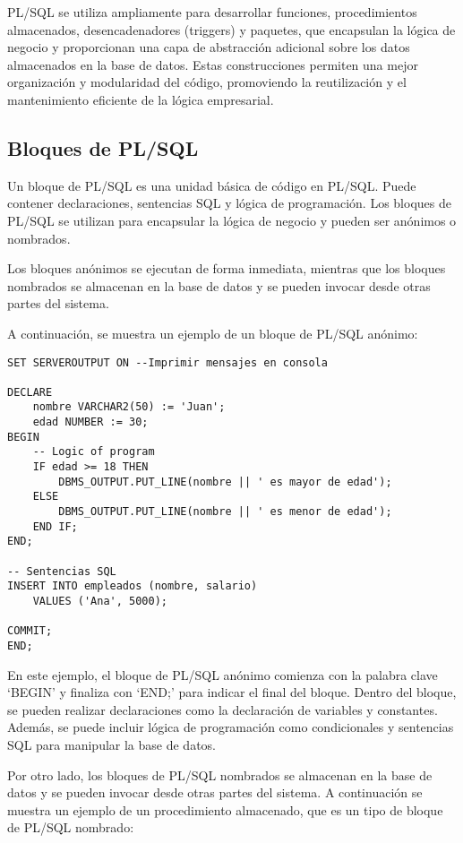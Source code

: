 \documentclass[executivepaper]{article}
\begin{document}
PL/SQL se utiliza ampliamente para desarrollar funciones, procedimientos almacenados, desencadenadores (triggers) y paquetes, que encapsulan la lógica de negocio y proporcionan una capa de abstracción adicional sobre los datos almacenados en la base de datos. Estas construcciones permiten una mejor organización y modularidad del código, promoviendo la reutilización y el mantenimiento eficiente de la lógica empresarial.

\subsection{Bloques de PL/SQL}
Un bloque de PL/SQL es una unidad básica de código en PL/SQL. Puede contener declaraciones, sentencias SQL y lógica de programación. Los bloques de PL/SQL se utilizan para encapsular la lógica de negocio y pueden ser anónimos o nombrados.

Los bloques anónimos se ejecutan de forma inmediata, mientras que los bloques nombrados se almacenan en la base de datos y se pueden invocar desde otras partes del sistema.

A continuación, se muestra un ejemplo de un bloque de PL/SQL anónimo:

\begin{lstlisting}
SET SERVEROUTPUT ON --Imprimir mensajes en consola

DECLARE
    nombre VARCHAR2(50) := 'Juan';
    edad NUMBER := 30;
BEGIN
    -- Logic of program
    IF edad >= 18 THEN
        DBMS_OUTPUT.PUT_LINE(nombre || ' es mayor de edad');
    ELSE
        DBMS_OUTPUT.PUT_LINE(nombre || ' es menor de edad');
    END IF;
END;

-- Sentencias SQL
INSERT INTO empleados (nombre, salario)
    VALUES ('Ana', 5000);

COMMIT;
END;
\end{lstlisting}

En este ejemplo, el bloque de PL/SQL anónimo comienza con la palabra clave \enquote*{BEGIN} y finaliza con \enquote*{END;} para indicar el final del bloque. Dentro del bloque, se pueden realizar declaraciones como la declaración de variables y constantes. Además, se puede incluir lógica de programación como condicionales y sentencias SQL para manipular la base de datos.

Por otro lado, los bloques de PL/SQL nombrados se almacenan en la base de datos y se pueden invocar desde otras partes del sistema. A continuación se muestra un ejemplo de un procedimiento almacenado, que es un tipo de bloque de PL/SQL nombrado:
\end{document}
